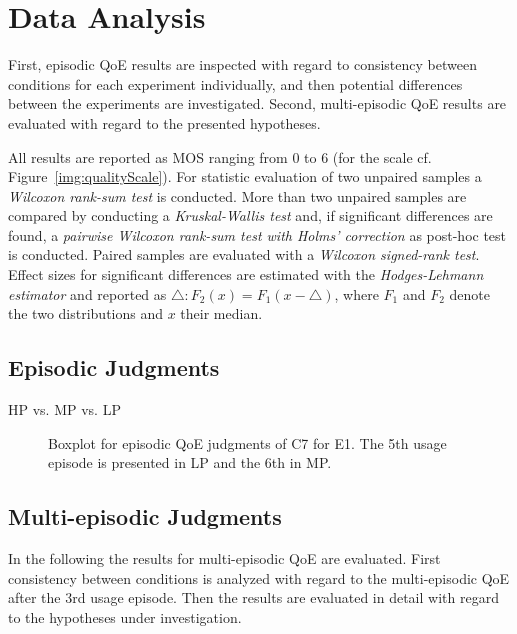 \section{Data Analysis}
First, episodic QoE results are inspected with regard to consistency between conditions for each experiment individually, and then potential differences between the experiments are investigated.
Second, multi-episodic QoE results are evaluated with regard to the presented hypotheses.

All results are reported as \ac{MOS} ranging from 0 to 6 (for the scale cf. Figure~\ref{img:qualityScale}).
For statistic evaluation of two unpaired samples a \emph{Wilcoxon rank-sum test} is conducted.
More than two unpaired samples are compared by conducting a \emph{Kruskal-Wallis test} and, if significant differences are found, a \emph{pairwise Wilcoxon rank-sum test with Holms' correction} as post-hoc test is conducted.
Paired samples are evaluated with a \emph{Wilcoxon signed-rank test}.
Effect sizes for significant differences are estimated with the \emph{Hodges-Lehmann estimator} and reported as $\triangle: F_{2}(x)=F_{1}(x-\triangle)$, where $F_{1}$ and $F_{2}$ denote the two distributions and $x$ their median.

\subsection{Episodic Judgments} 



HP vs. MP vs. LP


\begin{figure}
	\caption{Boxplot for episodic QoE judgments of C7 for E1.
	The 5th usage episode is presented in LP and the 6th in MP.}
	\label{img:lab:boxplotE1c7}
\end{figure}

\subsection{Multi-episodic Judgments}
In the following the results for multi-episodic QoE are evaluated.
First consistency between conditions is analyzed with regard to the multi-episodic QoE after the 3rd usage episode.
Then the results are evaluated in detail with regard to the hypotheses under investigation.

